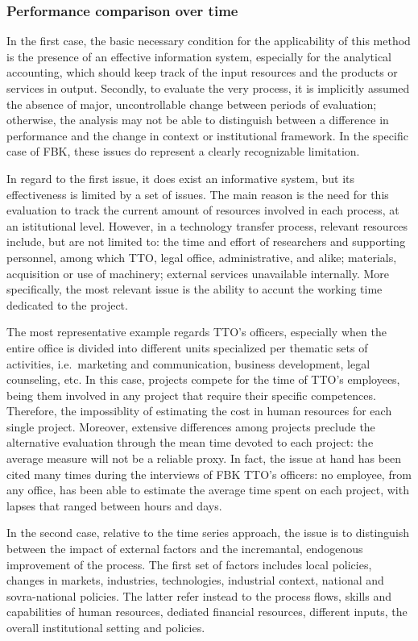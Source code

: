 \subsubsection{Performance comparison over time}

In the first case, the basic necessary condition for the applicability of this method is the presence of an effective information system, especially for the analytical accounting, which should keep track of the input resources and the products or services in output. Secondly, to evaluate the very process, it is implicitly assumed the absence of major, uncontrollable change between periods of evaluation; otherwise, the analysis may not be able to distinguish between a difference in performance and the change in context or institutional framework. In the specific case of FBK, these issues do represent a clearly recognizable limitation. 

In regard to the first issue, it does exist an informative system, but its effectiveness is limited by a set of issues. The main reason is the need for this evaluation to track the current amount of resources involved in each process, at an istitutional level. However, in a technology transfer process, relevant resources include, but are not limited to: the time and effort of researchers and supporting personnel, among which TTO, legal office, administrative, and alike; materials, acquisition or use of machinery; external services unavailable internally. More specifically, the most relevant issue is the ability to accunt the working time dedicated to the project. 

The most representative example regards TTO's officers, especially when the entire office is divided into different units specialized per thematic sets of activities, i.e.\ marketing and communication, business development, legal counseling, etc. In this case, projects compete for the time of TTO's employees, being them involved in any project that require their specific competences. Therefore, the impossiblity of estimating the cost in human resources for each single project. Moreover, extensive differences among projects preclude the alternative evaluation through the mean time devoted to each project: the average measure will not be a reliable proxy. In fact, the issue at hand has been cited many times during the interviews of FBK TTO's officers: no employee, from any office, has been able to estimate the average time spent on each project, with lapses that ranged between hours and days.

In the second case, relative to the time series approach, the issue is to distinguish between the impact of external factors and the incremantal, endogenous improvement of the process. The first set of factors includes local policies, changes in markets, industries, technologies, industrial context, national and sovra-national policies. The latter refer instead to the process flows, skills and capabilities of human resources, dediated financial resources, different inputs, the overall institutional setting and policies.

